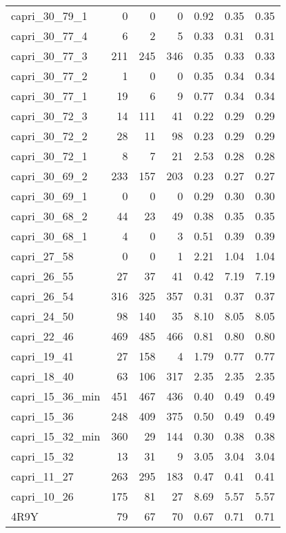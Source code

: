 \begin{table}[h]
\begin{center}
\begin{tabular}{ l | r | r | r | c | c | c }
       capri\_30\_79\_1 & 0 & 0 & 0 & 0.92 & 0.35 & 0.35 \\
       capri\_30\_77\_4 & 6 & 2 & 5 & 0.33 & 0.31 & 0.31 \\
       capri\_30\_77\_3 & 211 & 245 & 346 & 0.35 & 0.33 & 0.33 \\
       capri\_30\_77\_2 & 1 & 0 & 0 & 0.35 & 0.34 & 0.34 \\
       capri\_30\_77\_1 & 19 & 6 & 9 & 0.77 & 0.34 & 0.34 \\
       capri\_30\_72\_3 & 14 & 111 & 41 & 0.22 & 0.29 & 0.29 \\
       capri\_30\_72\_2 & 28 & 11 & 98 & 0.23 & 0.29 & 0.29 \\
       capri\_30\_72\_1 & 8 & 7 & 21 & 2.53 & 0.28 & 0.28 \\
       capri\_30\_69\_2 & 233 & 157 & 203 & 0.23 & 0.27 & 0.27 \\
       capri\_30\_69\_1 & 0 & 0 & 0 & 0.29 & 0.30 & 0.30 \\
       capri\_30\_68\_2 & 44 & 23 & 49 & 0.38 & 0.35 & 0.35 \\
       capri\_30\_68\_1 & 4 & 0 & 3 & 0.51 & 0.39 & 0.39 \\
       capri\_27\_58 & 0 & 0 & 1 & 2.21 & 1.04 & 1.04 \\
       capri\_26\_55 & 27 & 37 & 41 & 0.42 & 7.19 & 7.19 \\
       capri\_26\_54 & 316 & 325 & 357 & 0.31 & 0.37 & 0.37 \\
       capri\_24\_50 & 98 & 140 & 35 & 8.10 & 8.05 & 8.05 \\
       capri\_22\_46 & 469 & 485 & 466 & 0.81 & 0.80 & 0.80 \\
       capri\_19\_41 & 27 & 158 & 4 & 1.79 & 0.77 & 0.77 \\
       capri\_18\_40 & 63 & 106 & 317 & 2.35 & 2.35 & 2.35 \\
       capri\_15\_36\_min & 451 & 467 & 436 & 0.40 & 0.49 & 0.49 \\
       capri\_15\_36 & 248 & 409 & 375 & 0.50 & 0.49 & 0.49 \\
       capri\_15\_32\_min & 360 & 29 & 144 & 0.30 & 0.38 & 0.38 \\
       capri\_15\_32 & 13 & 31 & 9 & 3.05 & 3.04 & 3.04 \\
       capri\_11\_27 & 263 & 295 & 183 & 0.47 & 0.41 & 0.41 \\
       capri\_10\_26 & 175 & 81 & 27 & 8.69 & 5.57 & 5.57 \\
       4R9Y & 79 & 67 & 70 & 0.67 & 0.71 & 0.71 \\

\end{tabular}
\end{center}
\end{table}
